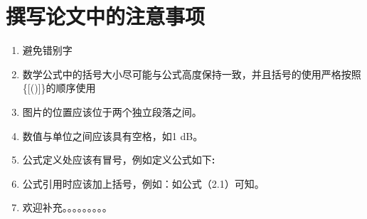 
\chapter{撰写论文中的注意事项}
\begin{enumerate}
\item{避免错别字}
\item{数学公式中的括号大小尽可能与公式高度保持一致，并且括号的使用严格按照\{[()]\}的顺序使用}
\item{图片的位置应该位于两个独立段落之间。}
\item{数值与单位之间应该具有空格，如1 dB。}
\item{公式定义处应该有冒号，例如定义公式如下\textbf{:}}
\item{公式引用时应该加上括号，例如：如公式（2.1）可知。}
\item{欢迎补充。。。。。。。。。}
\end{enumerate}

